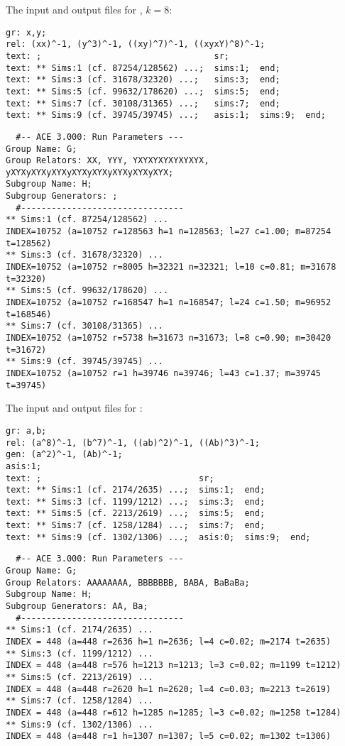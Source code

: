 The input and output files for \cite[Example 5.3]{Sim94}, $k=8$:

\bv\begin{verbatim}
gr: x,y;
rel: (xx)^-1, (y^3)^-1, ((xy)^7)^-1, ((xyxY)^8)^-1;
text: ;                                  sr;
text: ** Sims:1 (cf. 87254/128562) ...;  sims:1;  end;
text: ** Sims:3 (cf. 31678/32320) ...;   sims:3;  end;
text: ** Sims:5 (cf. 99632/178620) ...;  sims:5;  end;
text: ** Sims:7 (cf. 30108/31365) ...;   sims:7;  end;
text: ** Sims:9 (cf. 39745/39745) ...;   asis:1;  sims:9;  end;
\end{verbatim}\ev

\bv\begin{verbatim}
  #-- ACE 3.000: Run Parameters ---
Group Name: G;
Group Relators: XX, YYY, YXYXYXYXYXYXYX, yXYXyXYXyXYXyXYXyXYXyXYXyXYXyXYX;
Subgroup Name: H;
Subgroup Generators: ;
  #--------------------------------
** Sims:1 (cf. 87254/128562) ...
INDEX=10752 (a=10752 r=128563 h=1 n=128563; l=27 c=1.00; m=87254 t=128562)
** Sims:3 (cf. 31678/32320) ...
INDEX=10752 (a=10752 r=8005 h=32321 n=32321; l=10 c=0.81; m=31678 t=32320)
** Sims:5 (cf. 99632/178620) ...
INDEX=10752 (a=10752 r=168547 h=1 n=168547; l=24 c=1.50; m=96952 t=168546)
** Sims:7 (cf. 30108/31365) ...
INDEX=10752 (a=10752 r=5738 h=31673 n=31673; l=8 c=0.90; m=30420 t=31672)
** Sims:9 (cf. 39745/39745) ...
INDEX=10752 (a=10752 r=1 h=39746 n=39746; l=43 c=1.37; m=39745 t=39745)
\end{verbatim}\ev

The input and output files for \cite[Example 5.4]{Sim94}:

\bv\begin{verbatim}
gr: a,b;
rel: (a^8)^-1, (b^7)^-1, ((ab)^2)^-1, ((Ab)^3)^-1;
gen: (a^2)^-1, (Ab)^-1;
asis:1;
text: ;                               sr;
text: ** Sims:1 (cf. 2174/2635) ...;  sims:1;  end;
text: ** Sims:3 (cf. 1199/1212) ...;  sims:3;  end;
text: ** Sims:5 (cf. 2213/2619) ...;  sims:5;  end;
text: ** Sims:7 (cf. 1258/1284) ...;  sims:7;  end;
text: ** Sims:9 (cf. 1302/1306) ...;  asis:0;  sims:9;  end;
\end{verbatim}\ev

\bv\begin{verbatim}
  #-- ACE 3.000: Run Parameters ---
Group Name: G;
Group Relators: AAAAAAAA, BBBBBBB, BABA, BaBaBa;
Subgroup Name: H;
Subgroup Generators: AA, Ba;
  #--------------------------------
** Sims:1 (cf. 2174/2635) ...
INDEX = 448 (a=448 r=2636 h=1 n=2636; l=4 c=0.02; m=2174 t=2635)
** Sims:3 (cf. 1199/1212) ...
INDEX = 448 (a=448 r=576 h=1213 n=1213; l=3 c=0.02; m=1199 t=1212)
** Sims:5 (cf. 2213/2619) ...
INDEX = 448 (a=448 r=2620 h=1 n=2620; l=4 c=0.03; m=2213 t=2619)
** Sims:7 (cf. 1258/1284) ...
INDEX = 448 (a=448 r=612 h=1285 n=1285; l=3 c=0.02; m=1258 t=1284)
** Sims:9 (cf. 1302/1306) ...
INDEX = 448 (a=448 r=1 h=1307 n=1307; l=5 c=0.02; m=1302 t=1306)
\end{verbatim}\ev

